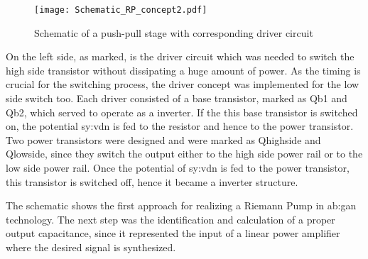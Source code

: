 \begin{figure}[ht]
	\centering
  \texttt{[image: Schematic\_RP\_concept2.pdf]}
	\caption{Schematic of a push-pull stage with corresponding driver circuit}
	\label{fig:SchematicRiemannPump}
\end{figure}

On the left side, as marked, is the driver circuit which was needed to switch the high side transistor without dissipating a huge amount of power.
As the timing is crucial for the switching process, the driver concept was implemented for the low side switch too.
Each driver consisted of a base transistor, marked as Qb1 and Qb2, which served to operate as a inverter.
If the this base transistor is switched on, the potential \gls{sy:vdn} is fed to the resistor and hence to the power transistor. 
Two power transistors were designed and were marked as Qhighside and Qlowside, since they switch the output either to the high side power rail or to the low side power rail.
Once the potential of \gls{sy:vdn} is fed to the power transistor, this transistor is switched off, hence it became a inverter structure.

The schematic shows the first approach for realizing a Riemann Pump in \gls{ab:gan} technology.
The next step was the identification and calculation of a proper output capacitance, since it represented the input of a linear power amplifier where the desired signal is synthesized.
 
